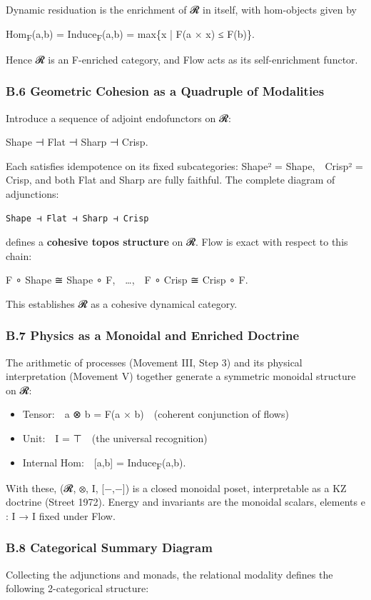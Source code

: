 \documentclass[11pt]{article}
\begin{document}
Dynamic residuation is the enrichment of 𝓡 in itself,  
with hom-objects given by

Hom\textsubscript{F}(a,b) = Induce\textsubscript{F}(a,b) = max\{x | F(a × x) ≤ F(b)\}.

Hence 𝓡 is an F-enriched category,  
and Flow acts as its self-enrichment functor.
\subsubsection*{B.6 Geometric Cohesion as a Quadruple of Modalities}
\label{sec:org563129b}
Introduce a sequence of adjoint endofunctors on 𝓡:

Shape ⊣ Flat ⊣ Sharp ⊣ Crisp.

Each satisfies idempotence on its fixed subcategories:  
Shape² = Shape, Crisp² = Crisp,  
and both Flat and Sharp are fully faithful.  
The complete diagram of adjunctions:

\begin{verbatim}
Shape ⊣ Flat ⊣ Sharp ⊣ Crisp
\end{verbatim}

defines a \textbf{cohesive topos structure} on 𝓡.  
Flow is exact with respect to this chain:

F ∘ Shape ≅ Shape ∘ F, …, F ∘ Crisp ≅ Crisp ∘ F.

This establishes 𝓡 as a cohesive dynamical category.
\subsubsection*{B.7 Physics as a Monoidal and Enriched Doctrine}
\label{sec:org0164ae3}
The arithmetic of processes (Movement III, Step 3) and its physical interpretation (Movement V)  
together generate a symmetric monoidal structure on 𝓡:

\begin{itemize}
\item Tensor: a ⊗ b = F(a × b) (coherent conjunction of flows)
\item Unit: I = ⊤ (the universal recognition)
\item Internal Hom: [a,b] = Induce\textsubscript{F}(a,b).
\end{itemize}

With these, (𝓡, ⊗, I, [−,−]) is a closed monoidal poset,  
interpretable as a KZ doctrine (Street 1972).  
Energy and invariants are the monoidal scalars,  
elements e : I → I fixed under Flow.
\subsubsection*{B.8 Categorical Summary Diagram}
\label{sec:org89bf6a7}
Collecting the adjunctions and monads,  
the relational modality defines the following 2-categorical structure:
\end{document}

